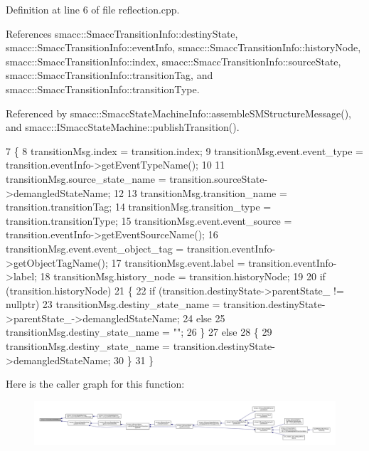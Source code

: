 Definition at line 6 of file reflection.\+cpp.



References smacc\+::\+Smacc\+Transition\+Info\+::destiny\+State, smacc\+::\+Smacc\+Transition\+Info\+::event\+Info, smacc\+::\+Smacc\+Transition\+Info\+::history\+Node, smacc\+::\+Smacc\+Transition\+Info\+::index, smacc\+::\+Smacc\+Transition\+Info\+::source\+State, smacc\+::\+Smacc\+Transition\+Info\+::transition\+Tag, and smacc\+::\+Smacc\+Transition\+Info\+::transition\+Type.



Referenced by smacc\+::\+Smacc\+State\+Machine\+Info\+::assemble\+S\+M\+Structure\+Message(), and smacc\+::\+I\+Smacc\+State\+Machine\+::publish\+Transition().


\begin{DoxyCode}
7 \{
8     transitionMsg.index = transition.index;
9     transitionMsg.event.event\_type = transition.eventInfo->getEventTypeName();
10 
11     transitionMsg.source\_state\_name = transition.sourceState->demangledStateName;
12     
13     transitionMsg.transition\_name = transition.transitionTag;
14     transitionMsg.transition\_type = transition.transitionType;
15     transitionMsg.event.event\_source = transition.eventInfo->getEventSourceName();
16     transitionMsg.event.event\_object\_tag = transition.eventInfo->getObjectTagName();
17     transitionMsg.event.label = transition.eventInfo->label;
18     transitionMsg.history\_node = transition.historyNode;
19 
20     \textcolor{keywordflow}{if} (transition.historyNode)
21     \{
22         \textcolor{keywordflow}{if} (transition.destinyState->parentState\_ != \textcolor{keyword}{nullptr})
23             transitionMsg.destiny\_state\_name = transition.destinyState->parentState\_->demangledStateName;
24         \textcolor{keywordflow}{else}
25             transitionMsg.destiny\_state\_name = \textcolor{stringliteral}{""};
26     \}
27     \textcolor{keywordflow}{else}
28     \{
29         transitionMsg.destiny\_state\_name = transition.destinyState->demangledStateName;
30     \}
31 \}
\end{DoxyCode}


Here is the caller graph for this function\+:
\nopagebreak
\begin{figure}[H]
\begin{center}
\leavevmode
\includegraphics[width=350pt]{namespacesmacc_a6cda75a51f4a5e29d0a64effb800fb61_icgraph}
\end{center}
\end{figure}


